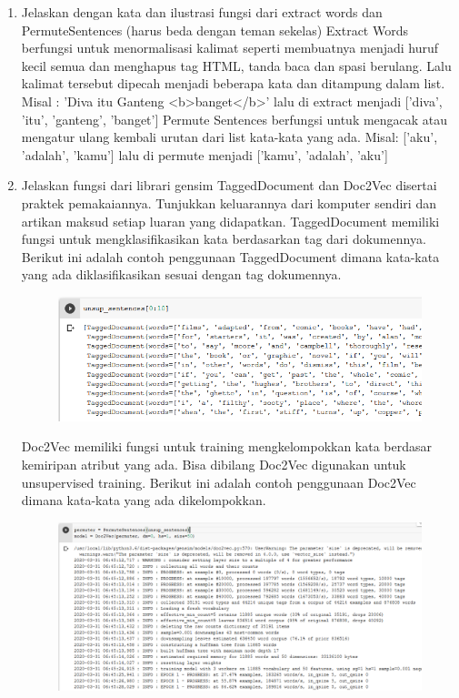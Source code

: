 \begin{enumerate}
	\item Jelaskan dengan kata dan ilustrasi fungsi dari extract words dan PermuteSentences (harus beda dengan teman sekelas)
	\hfill\break
	Extract Words berfungsi untuk menormalisasi kalimat seperti membuatnya menjadi huruf kecil semua dan menghapus tag HTML, tanda baca dan spasi berulang. Lalu kalimat tersebut dipecah menjadi beberapa kata dan ditampung dalam list. Misal : 'Diva itu Ganteng <b>banget</b>' lalu di extract menjadi ['diva', 'itu', 'ganteng', 'banget']
	\hfill\break
	Permute Sentences berfungsi untuk mengacak atau mengatur ulang kembali urutan dari list kata-kata yang ada. Misal: ['aku', 'adalah', 'kamu'] lalu di permute menjadi ['kamu', 'adalah', 'aku']

	\item Jelaskan fungsi dari librari gensim TaggedDocument dan Doc2Vec disertai praktek pemakaiannya. Tunjukkan keluarannya dari komputer sendiri dan artikan maksud setiap luaran yang didapatkan.
	\hfill\break
	TaggedDocument memiliki fungsi untuk mengklasifikasikan kata berdasarkan tag dari dokumennya. Berikut ini adalah contoh penggunaan TaggedDocument dimana kata-kata yang ada diklasifikasikan sesuai dengan tag dokumennya.
	\hfill\break
	\begin{figure}[H]
	\centering
		\includegraphics[width=8 cm]{figures/1174006/chapter5/soalpraktek/tagged2.PNG}
	\end{figure}
	\hfill\break
	Doc2Vec memiliki fungsi untuk  training mengkelompokkan kata berdasar kemiripan atribut yang ada. Bisa dibilang Doc2Vec digunakan untuk unsupervised training. Berikut ini adalah contoh penggunaan Doc2Vec dimana kata-kata yang ada dikelompokkan.
	\hfill\break
	\begin{figure}[H]
	\centering
		\includegraphics[width=8 cm]{figures/1174006/chapter5/soalpraktek/doc4vec2.PNG}
	\end{figure}


\end{enumerate}
